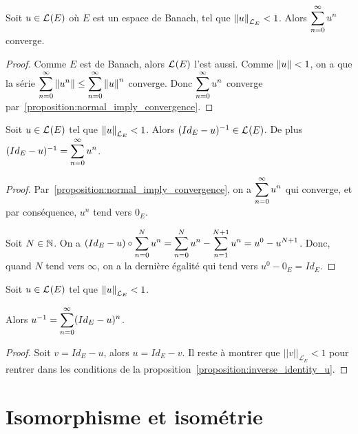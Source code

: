 \begin{proposition}
	Soit $u \in \mathcal{L}_{}(E)$ où $E$ est un espace de Banach, tel que
	$\norm{u}_{\mathcal{L}_{E}} < 1$. Alors
	$\displaystyle \sum_{n = 0}^{\infty} u^{n}$ converge.
\end{proposition}

\ifdefined\outputproof
\begin{proof}
	Comme $E$ est de Banach, alors $\mathcal{L}_{}(E)$ l'est aussi. Comme $\norm{u}
	< 1$, on a que la série $\displaystyle \sum_{n = 0}^{\infty} \norm{u^{n}} \leq
	\displaystyle \sum_{n = 0}^{\infty} \norm{u}^{n}$ converge. Donc
	$\displaystyle \sum_{n = 0}^{\infty} u^{n}$ converge
	par~\ref{proposition:normal_imply_convergence}.
\end{proof}
\fi

\begin{proposition}
	\label{proposition:inverse_identity_u}
	Soit $u \in \mathcal{L}_{}(E)$ tel que $\norm{u}_{\mathcal{L}_{E}} < 1$. Alors
	$(Id_{E} - u)^{-1} \in \mathcal{L}_{}(E)$. De plus $(Id_{E} - u)^{-1} =
	\displaystyle \sum_{n = 0}^{\infty} u^{n}$.
\end{proposition}

\ifdefined\outputproof
\begin{proof}
	Par~\ref{proposition:normal_imply_convergence}, on a
	$\displaystyle \sum_{n = 0}^{\infty} u^{n}$ qui converge, et par conséquence, $u^{n}$ tend
	vers $0_{E}$.

	Soit $N \in \mathbb{N}$. On a $(Id_{E} - u) \circ \displaystyle \sum_{n = 0}^{N} u^{n} =
	\displaystyle \sum_{n = 0}^{N} u^{n} - \displaystyle \sum_{n = 1}^{N + 1} u^{n} = u^{0} - u^{N
	+ 1}$. Donc, quand $N$ tend vers $\infty$, on a la dernière égalité qui tend
	vers $u^{0} - 0_{E} = Id_{E}$.
\end{proof}
\fi

\begin{corollary}
	Soit $u \in \mathcal{L}_{}(E)$ tel que $\norm{u}_{\mathcal{L}_{E}} < 1$.

	Alors $u^{-1} = \displaystyle \sum_{n = 0}^{\infty} (Id_{E} - u)^{n}$.
\end{corollary}

\ifdefined\outputproof
\begin{proof}
	Soit $v = Id_{E} - u$, alors $u = Id_{E} - v$. Il reste à montrer que
	$||v||_{\mathcal{L}_{E}} < 1$ pour rentrer dans les conditions de la
	proposition~\ref{proposition:inverse_identity_u}.
\end{proof}
\fi

\section{Isomorphisme et isométrie}

